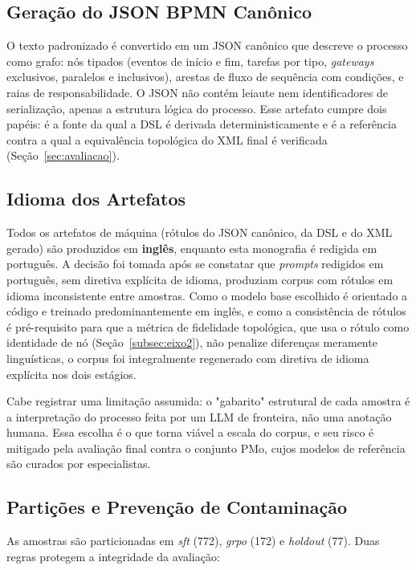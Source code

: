 \subsection{Geração do JSON BPMN Canônico}
\label{subsec:json-canonico}

O texto padronizado é convertido em um JSON canônico que descreve o processo como grafo: nós tipados (eventos de início e fim, tarefas por tipo, \textit{gateways} exclusivos, paralelos e inclusivos), arestas de fluxo de sequência com condições, e raias de responsabilidade. O JSON não contém leiaute nem identificadores de serialização, apenas a estrutura lógica do processo. Esse artefato cumpre dois papéis: é a fonte da qual a DSL é derivada deterministicamente e é a referência contra a qual a equivalência topológica do XML final é verificada (Seção~\ref{sec:avaliacao}).

\subsection{Idioma dos Artefatos}
\label{subsec:idioma}

Todos os artefatos de máquina (rótulos do JSON canônico, da DSL e do XML gerado) são produzidos em \textbf{inglês}, enquanto esta monografia é redigida em português. A decisão foi tomada após se constatar que \textit{prompts} redigidos em português, sem diretiva explícita de idioma, produziam corpus com rótulos em idioma inconsistente entre amostras. Como o modelo base escolhido é orientado a código e treinado predominantemente em inglês, e como a consistência de rótulos é pré-requisito para que a métrica de fidelidade topológica, que usa o rótulo como identidade de nó (Seção~\ref{subsec:eixo2}), não penalize diferenças meramente linguísticas, o corpus foi integralmente regenerado com diretiva de idioma explícita nos dois estágios.

Cabe registrar uma limitação assumida: o "gabarito" estrutural de cada amostra é a interpretação do processo feita por um LLM de fronteira, não uma anotação humana. Essa escolha é o que torna viável a escala do corpus, e seu risco é mitigado pela avaliação final contra o conjunto PMo, cujos modelos de referência são curados por especialistas.

\subsection{Partições e Prevenção de Contaminação}
\label{subsec:particoes}

As amostras são particionadas em \textit{sft} (772), \textit{grpo} (172) e \textit{holdout} (77). Duas regras protegem a integridade da avaliação:

